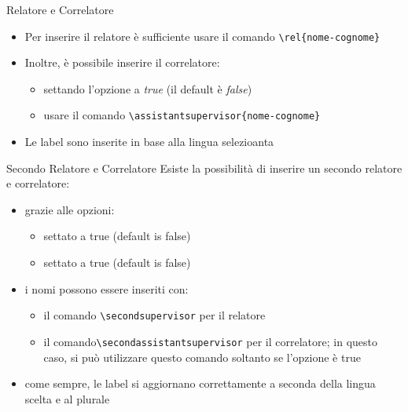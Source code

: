 \begin{frame}[t,fragile]{Relatore e Correlatore}
\begin{itemize}
\item Per inserire il relatore è sufficiente usare il comando \verb!\rel{nome-cognome}!
\item Inoltre, è possibile inserire il correlatore:
\begin{itemize}
\item settando l'opzione  a \emph{true} (il default è \emph{false})
\item usare il comando \verb!\assistantsupervisor{nome-cognome}!
\end{itemize}
\item Le label sono inserite in base alla lingua selezioanta
\end{itemize}
\end{frame}
\begin{frame}[t,fragile]{Secondo Relatore e Correlatore}\label{secondrel}
Esiste la possibilità di inserire un secondo relatore e correlatore:
\begin{itemize}
\item grazie alle opzioni:
\begin{itemize}
\item {} settato a true (default is false)
\item {} settato a true (default is false)
\end{itemize}
\item i nomi possono essere inseriti con:
\begin{itemize}
\item il comando \verb!\secondsupervisor! per il relatore
\item il comando\verb!\secondassistantsupervisor! per il correlatore; in questo caso, si può utilizzare questo comando soltanto se l'opzione  è true
\end{itemize}
\item come sempre, le label si aggiornano correttamente a seconda della lingua scelta e al plurale
\end{itemize}
\end{frame}
